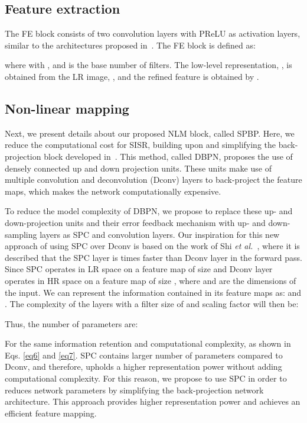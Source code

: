\documentclass[a4paper,11pt]{article}
\begin{document}
\subsection{Feature extraction}
The FE block consists of two convolution layers with PReLU as activation layers, similar to the architectures proposed in~\cite{DBPN, FSRCNN}. The FE block is defined as:
 
where  with , and  is the base number of filters. The low-level representation, , is obtained from the LR image, , and the refined feature  is obtained by .
 
 
\subsection{Non-linear mapping}
Next, we present details about our proposed NLM block, called SPBP. Here, we reduce the computational cost for SISR, building upon and simplifying the back-projection block developed in~\cite{DBPN}. This method, called DBPN, proposes the use of densely connected up and down projection units. These units make use of multiple convolution and deconvolution (Dconv) layers to back-project the feature maps, which makes the network computationally expensive.

To reduce the model complexity of DBPN, we propose to replace these up- and down-projection units and their error feedback mechanism with up- and down-sampling layers as SPC and convolution layers. Our inspiration for this new approach of using SPC over Dconv is based on the work of Shi \textit{et al.}~\cite{ESPCN}, where it is described that the SPC layer is  times faster than Dconv layer in the forward pass. Since SPC operates in LR space on a feature map of size  and Dconv layer operates in HR space on a feature map of size , where  and  are the dimensions of the input. We can represent the information contained in its feature maps as:  and .
The complexity of the layers with a filter size of  and scaling factor  will then be:
\vspace{-0.5em}


Thus, the number of parameters are:


For the same information retention and computational complexity, as shown in Eqs. \eqref{eq6} and \eqref{eq7}. 
SPC contains larger number of parameters compared to Dconv, and therefore, upholds a higher representation power without adding computational complexity. For this reason, we propose to use SPC in order to reduces network parameters by simplifying the back-projection network architecture. This approach provides higher representation power and achieves an efficient feature mapping.
\end{document}
